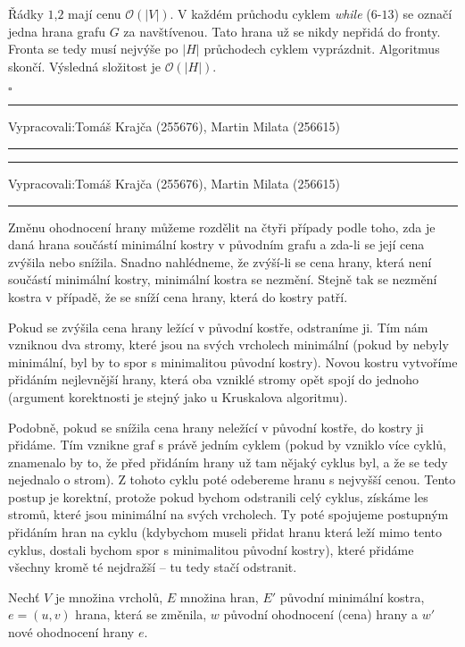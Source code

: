\documentclass[12pt]{article}
\renewcommand{\O}{\mathcal{O}}
\newcommand{\zadani}[2]{
{\large
\noindent {\bf IB108 \hfill{} Sada #1, Příklad #2 \\[-4mm]}
\noindent\hrule
\vspace{2mm}
\noindent Vypracovali:\hfill{}Tomáš Krajča (255676), Martin Milata (256615)
\vspace{3mm}
\hrule
\bigskip\bigskip}
}
\begin{document}
Řádky $1$,$2$ mají cenu $\O(|V|)$. V každém průchodu cyklem
\textit{while} ($6$-$13$) se označí jedna hrana grafu $G$ za navštívenou. Tato
hrana už se nikdy nepřidá do fronty. Fronta se tedy musí nejvýše po $|H|$
průchodech cyklem vyprázdnit. Algoritmus skončí. Výsledná složitost je
$\O(|H|)$.

\hfill$\square$

\clearpage
\zadani{3}{3}

\clearpage
\zadani{3}{4}

\noindent
Změnu ohodnocení hrany můžeme rozdělit na čtyři případy podle toho, zda je daná hrana součástí
minimální kostry v původním grafu a zda-li se její cena zvýšila nebo snížila.  Snadno nahlédneme, že
zvýší-li se cena hrany, která není součástí minimální kostry, minimální kostra se nezmění. Stejně
tak se nezmění kostra v případě, že se sníží cena hrany, která do kostry patří.

Pokud se zvýšila cena hrany ležící v původní kostře, odstraníme ji. Tím nám vzniknou dva stromy,
které jsou na svých vrcholech minimální
(pokud by nebyly minimální, byl by to spor s minimalitou původní kostry). Novou kostru
vytvoříme přidáním nejlevnější hrany, která oba vzniklé stromy opět spojí do jednoho (argument
korektnosti je stejný jako u Kruskalova algoritmu).

Podobně, pokud se snížila cena hrany neležící v původní kostře, do kostry ji přidáme. Tím vznikne graf
s právě jedním cyklem (pokud by vzniklo více cyklů, znamenalo by to, že před přidáním hrany už tam nějaký
cyklus byl, a že se tedy nejednalo o strom). Z tohoto cyklu poté odebereme hranu s nejvyšší cenou. Tento
postup je korektní, protože pokud bychom odstranili celý cyklus, získáme les stromů, které jsou
minimální na svých vrcholech.
Ty poté spojujeme postupným přidáním hran na cyklu (kdybychom museli přidat hranu která leží mimo
tento cyklus, dostali bychom spor s minimalitou původní kostry), které přidáme všechny kromě té nejdražší
-- tu tedy stačí odstranit.

Nechť $V$ je množina vrcholů, $E$ množina hran, $E'$ původní minimální kostra, $e=(u,v)$ hrana, která
se změnila, $w$ původní ohodnocení (cena) hrany a $w'$ nové ohodnocení hrany $e$.
\end{document}

